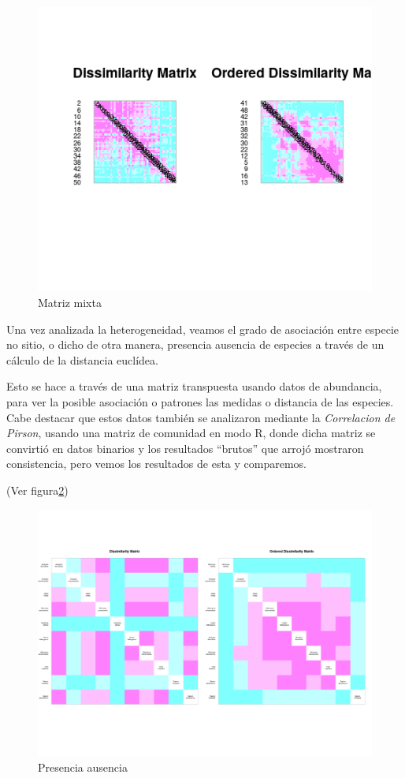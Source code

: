 \documentclass[11pt,]{article}
\begin{document}
\begin{figure}
\centering
\includegraphics{puntuacion_z.png}
\caption{\label{fig:puntuacion_z}Matriz mixta}
\end{figure}

Una vez analizada la heterogeneidad, veamos el grado de asociación entre
especie no sitio, o dicho de otra manera, presencia ausencia de especies
a través de un cálculo de la distancia euclídea.

Esto se hace a través de una matriz transpuesta usando datos de
abundancia, para ver la posible asociación o patrones las medidas o
distancia de las especies. Cabe destacar que estos datos también se
analizaron mediante la \emph{Correlacion de Pirson}, usando una matriz
de comunidad en modo R, donde dicha matriz se convirtió en datos
binarios y los resultados ``brutos'' que arrojó mostraron consistencia,
pero vemos los resultados de esta y comparemos.

(Ver figura\ref{fig:asociacion_especie_no_sitio})

\begin{figure}
\centering
\includegraphics{asociacion_especie_no_sitio.png}
\caption{\label{fig:asociacion_especie_no_sitio}Presencia ausencia}
\end{figure}
\end{document}
